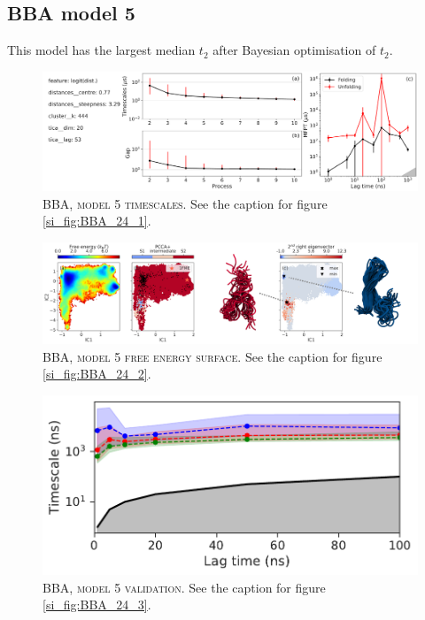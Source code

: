 \documentclass{article}
\begin{document}
\FloatBarrier
\clearpage



\subsection{BBA model 5}

This model has the largest median $t_{2}$ after Bayesian optimisation of $t_2$.

\begin{figure}[h]
    \centering
    \includegraphics[width=\columnwidth]{SI_figures/BBA_227_SI-1.pdf}
    \caption{\textsc{BBA,  model 5 timescales}. See the caption for figure \ref{si_fig:BBA_24_1}.}
    \label{si_fig:BBA_227_1}
\end{figure}

\begin{figure}[h]
    \centering
    \includegraphics[width=\columnwidth]{SI_figures/BBA_227_SI-2.png}
    \caption{\textsc{BBA,  model 5 free energy surface}. See the caption for figure \ref{si_fig:BBA_24_2}.}
    \label{si_fig:BBA_227_2}
\end{figure}

\begin{figure}[h]
    \centering
    \includegraphics[height=0.15\textheight]{SI_figures/BBA_227_its.pdf}
    \caption{\textsc{BBA, model 5 validation}. See the caption for  figure \ref{si_fig:BBA_24_3}.}
    \label{si_fig:BBA_227_3}
\end{figure}
\end{document}
